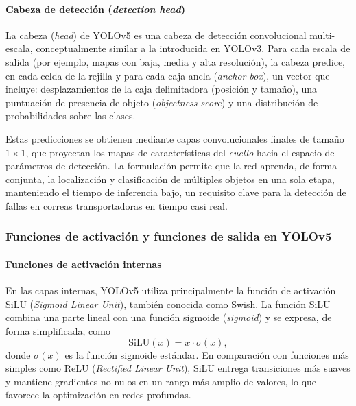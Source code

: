 \paragraph{Cabeza de detección (\textit{detection head})}

\par La cabeza (\textit{head}) de YOLOv5 es una cabeza de detección convolucional multi-escala, conceptualmente similar a la introducida en YOLOv3. Para cada escala de salida (por ejemplo, mapas con baja, media y alta resolución), la cabeza predice, en cada celda de la rejilla y para cada caja ancla (\textit{anchor box}), un vector que incluye: desplazamientos de la caja delimitadora (posición y tamaño), una puntuación de presencia de objeto (\textit{objectness score}) y una distribución de probabilidades sobre las clases. \\

\par Estas predicciones se obtienen mediante capas convolucionales finales de tamaño $1\times1$, que proyectan los mapas de características del \textit{cuello} hacia el espacio de parámetros de detección. La formulación permite que la red aprenda, de forma conjunta, la localización y clasificación de múltiples objetos en una sola etapa, manteniendo el tiempo de inferencia bajo, un requisito clave para la detección de fallas en correas transportadoras en tiempo casi real.

\subsubsection{Funciones de activación y funciones de salida en YOLOv5}

\paragraph{Funciones de activación internas}

\par En las capas internas, YOLOv5 utiliza principalmente la función de activación SiLU (\textit{Sigmoid Linear Unit}), también conocida como Swish. La función SiLU combina una parte lineal con una función sigmoide (\textit{sigmoid}) y se expresa, de forma simplificada, como
\[
    \mathrm{SiLU}(x) = x \cdot \sigma(x),
\]
donde $\sigma(x)$ es la función sigmoide estándar. En comparación con funciones más simples como ReLU (\textit{Rectified Linear Unit}), SiLU entrega transiciones más suaves y mantiene gradientes no nulos en un rango más amplio de valores, lo que favorece la optimización en redes profundas. \\

